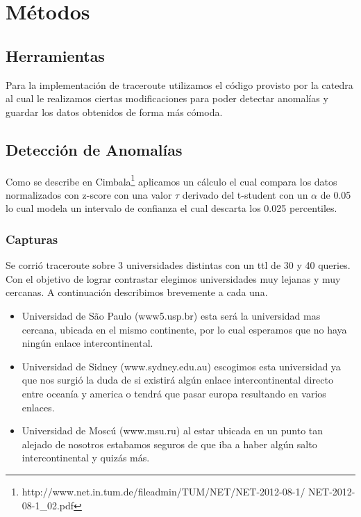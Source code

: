 \section{Métodos}

\subsection*{Herramientas}
Para la implementación de traceroute utilizamos el código provisto por la catedra al cual le realizamos ciertas modificaciones para poder detectar anomalías y guardar los datos obtenidos de forma más cómoda.

\subsection*{Detección de Anomalías}

Como se describe en Cimbala\footnote{http://www.net.in.tum.de/fileadmin/TUM/NET/NET-2012-08-1/
NET-2012-08-1\_02.pdf} aplicamos un cálculo el cual compara los datos normalizados con z-score con una valor $\tau$ derivado del t-student con un $\alpha$ de 0.05 lo cual modela un intervalo de confianza el cual descarta los 0.025 percentiles.


\subsubsection*{Capturas}
Se corrió traceroute sobre 3 universidades distintas con un ttl de 30 y 40 queries. Con el objetivo de lograr contrastar elegimos universidades muy lejanas y muy cercanas. A continuación describimos brevemente a cada una.

\begin{itemize}
	\item Universidad de São Paulo (www5.usp.br) esta será la universidad mas cercana, ubicada en el mismo continente, por lo cual esperamos que no haya ningún enlace intercontinental.
	\item Universidad de Sidney (www.sydney.edu.au) escogimos esta universidad ya que nos surgió la duda de si existirá algún enlace intercontinental directo entre oceanía y america o tendrá que pasar europa resultando en varios enlaces.
	\item Universidad de Moscú (www.msu.ru) al estar ubicada en un punto tan alejado de nosotros estabamos seguros de que iba a haber algún salto intercontinental y quizás más.
\end{itemize}
